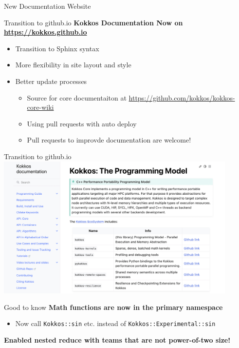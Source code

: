 

\begin{frame}[fragile]

        {\Huge New Documentation Website}

  \vspace{-20pt}

\end{frame}


\begin{frame}[fragile]{Transition to github.io}
\textbf{Kokkos Documentation Now on \url{https://kokkos.github.io}}

\begin{itemize}
  \item {Transition to Sphinx syntax}
  \item {More flexibility in site layout and style}
  \item {Better update processes}
  \begin{itemize}
    \item {Source for core documentaiton at \url{https://github.com/kokkos/kokkos-core-wiki}}
    \item {Using pull requests with auto deploy}
    \item {Pull requests to improvde documentation are welcome!}
  \end{itemize}
\end{itemize}
\end{frame}

\begin{frame}[fragile]{Transition to github.io}
\includegraphics[width=0.9\textwidth]{3_7/website.png}
\end{frame}

\begin{frame}[fragile]{Good to know}
\textbf{Math functions are now in the primary namespace}
\begin{itemize}
  \item Now call \texttt{Kokkos::sin} etc. instead of \texttt{Kokkos::Experimental::sin}
\end{itemize}

\vspace{20pt}
\textbf{Enabled nested reduce with teams that are not power-of-two size!} 

\end{frame}
